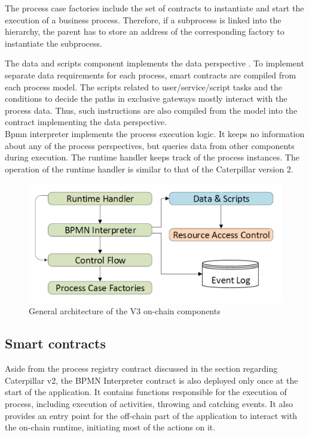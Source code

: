 The process case factories include the set of contracts to instantiate and start the execution of a business process. Therefore, if a subprocess is linked into the hierarchy, the parent has to store an address of the corresponding factory to instantiate the subprocess.

The data and scripts component implements the data perspective \cite{caterpillarv3}. To implement separate data requirements for each process, smart contracts are compiled from each process model. The scripts related to user/service/script tasks and the conditions to decide the paths in exclusive gateways mostly interact with the process data. Thus, such instructions are also compiled from the model into the contract implementing the data perspective.\\

Bpmn interpreter implements the process execution logic. It keeps no information about any of the process perspectives, but queries data from other components during execution. The runtime handler keeps track of the process instances. The operation of the runtime handler is similar to that of the Caterpillar version 2.

\begin{figure}[hbt]
	\includegraphics[width=\textwidth]{gfx/caterpillar-interpretation-architecture}
	\caption{General architecture of the V3 on-chain components}
	\label{fig:caterpillar:v3:architecture}
\end{figure}

\subsection{Smart contracts}
\label{sec:caterpillar:v3:contracts}

Aside from the process registry contract discussed in the section regarding Caterpillar v2, the BPMN Interpreter contract is also deployed only once at the start of the application. It contains functions responsible for the execution of process, including execution of activities, throwing and catching events. It also provides an entry point for the off-chain part of the application to interact with the on-chain runtime, initiating most of the actions on it.

